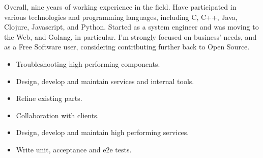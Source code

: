\documentclass[10pt,a4paper,ragged2e,withhyper]{altacv}
\begin{document}


\makecvheader


Overall, nine years of working experience in the field. Have participated in various technologies and programming languages, including C, C++, Java, Clojure, Javascript, and Python. Started as a system engineer and was moving to the Web, and Golang, in particular. I'm strongly focused on business' needs, and as a Free Software user, considering contributing further back to Open Source.

\begin{itemize}
\item Troubleshooting high performing components.
\item Design, develop and maintain services and internal tools.
\item Refine existing parts.
\item Collaboration with clients.
\end{itemize}
\divider

\begin{itemize}
\item Design, develop and maintain high performing services.
\item Write unit, acceptance and e2e tests.
\end{itemize}
\divider
\end{document}
